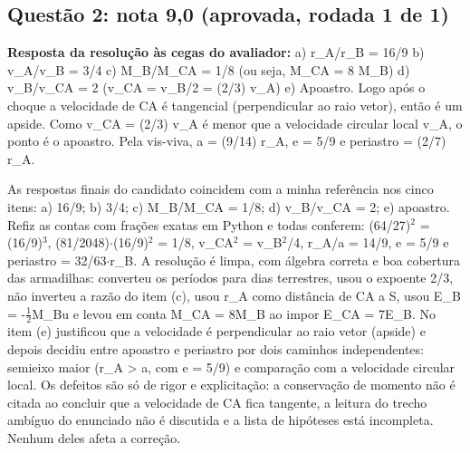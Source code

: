 \documentclass{article}%
\begin{document}
\subsection*{Questão 2: nota 9,0 (aprovada, rodada 1 de 1)}%
\textbf{Resposta da resolução às cegas do avaliador:} a) r\_A/r\_B = 16/9\newline%
b) v\_A/v\_B = 3/4\newline%
c) M\_B/M\_CA = 1/8 (ou seja, M\_CA = 8 M\_B)\newline%
d) v\_B/v\_CA = 2 (v\_CA = v\_B/2 = (2/3) v\_A)\newline%
e) Apoastro. Logo após o choque a velocidade de CA é tangencial (perpendicular ao raio vetor), então é um apside. Como v\_CA = (2/3) v\_A é menor que a velocidade circular local v\_A, o ponto é o apoastro. Pela vis{-}viva, a = (9/14) r\_A, e = 5/9 e periastro = (2/7) r\_A.\par %
As respostas finais do candidato coincidem com a minha referência nos cinco itens: a) 16/9; b) 3/4; c) M\_B/M\_CA = 1/8; d) v\_B/v\_CA = 2; e) apoastro. Refiz as contas com frações exatas em Python e todas conferem: (64/27)$^2$ = (16/9)$^3$, (81/2048)$\cdot$(16/9)$^2$ = 1/8, v\_CA$^2$ = v\_B$^2$/4, r\_A/a = 14/9, e = 5/9 e periastro = 32/63$\cdot$r\_B. A resolução é limpa, com álgebra correta e boa cobertura das armadilhas: converteu os períodos para dias terrestres, usou o expoente 2/3, não inverteu a razão do item (c), usou r\_A como distância de CA a S, usou E\_B = -$\frac12$M\_Bu e levou em conta M\_CA = 8M\_B ao impor E\_CA = 7E\_B. No item (e) justificou que a velocidade é perpendicular ao raio vetor (apside) e depois decidiu entre apoastro e periastro por dois caminhos independentes: semieixo maior (r\_A > a, com e = 5/9) e comparação com a velocidade circular local. Os defeitos são só de rigor e explicitação: a conservação de momento não é citada ao concluir que a velocidade de CA fica tangente, a leitura do trecho ambíguo do enunciado não é discutida e a lista de hipóteses está incompleta. Nenhum deles afeta a correção.%
\end{document}
